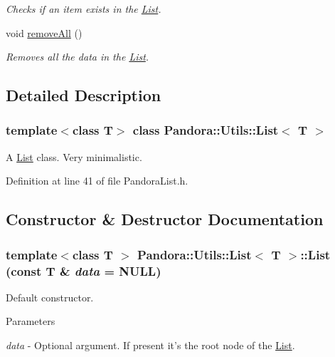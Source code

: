 \begin{DoxyCompactItemize}
\begin{DoxyCompactList}\small\item\em Checks if an item exists in the \hyperlink{classPandora_1_1Utils_1_1List}{List}. \item\end{DoxyCompactList}\item 
void \hyperlink{classPandora_1_1Utils_1_1List_a2dcb0105be0541caf1084c7faa4d1566}{removeAll} ()
\begin{DoxyCompactList}\small\item\em Removes all the data in the \hyperlink{classPandora_1_1Utils_1_1List}{List}. \item\end{DoxyCompactList}\end{DoxyCompactItemize}


\subsection{Detailed Description}
\subsubsection*{template$<$class T$>$ class Pandora::Utils::List$<$ T $>$}

A \hyperlink{classPandora_1_1Utils_1_1List}{List} class. Very minimalistic. 

Definition at line 41 of file PandoraList.h.

\subsection{Constructor \& Destructor Documentation}
\hypertarget{classPandora_1_1Utils_1_1List_aca19ef1d1d19775a487e1fa55a1aeb40}{
\subsubsection[{List}]{\setlength{\rightskip}{0pt plus 5cm}template$<$class T $>$ {\bf Pandora::Utils::List}$<$ T $>$::{\bf List} (const T \& {\em data} = {\ttfamily NULL})}}
\label{classPandora_1_1Utils_1_1List_aca19ef1d1d19775a487e1fa55a1aeb40}


Default constructor. 
\begin{DoxyParams}{Parameters}
\item[{\em data}]-\/ Optional argument. If present it's the root node of the \hyperlink{classPandora_1_1Utils_1_1List}{List}. \end{DoxyParams}


